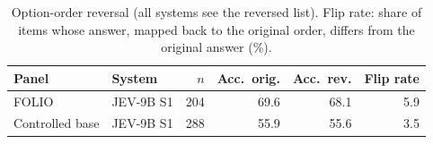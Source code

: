 \begin{table}[t]
\centering\small
\caption{Option-order reversal (all systems see the reversed list). Flip rate: share of items whose answer, mapped back to the original order, differs from the original answer (\%).}
\label{tab:reversal}
\begin{tabular}{@{}llrrrr@{}}
\toprule
Panel & System & $n$ & Acc.\ orig. & Acc.\ rev. & Flip rate \\
\midrule
FOLIO & JEV-9B S1 & 204 & 69.6 & 68.1 & 5.9 \\
\addlinespace
Controlled base & JEV-9B S1 & 288 & 55.9 & 55.6 & 3.5 \\
\bottomrule
\end{tabular}
\end{table}
